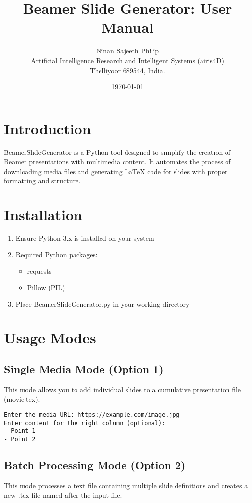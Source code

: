 \documentclass{article}
\title{Beamer Slide Generator: User Manual}
\author{Ninan Sajeeth Philip\\\href{https://airis4d.com}{Artificial Intelligence Research and Intelligent Systems (airis4D)}\\Thelliyoor 689544, India.}
\date{\today}
\begin{document}
\maketitle

\section{Introduction}
BeamerSlideGenerator is a Python tool designed to simplify the creation of Beamer presentations with multimedia content. It automates the process of downloading media files and generating LaTeX code for slides with proper formatting and structure.

\section{Installation}
\begin{enumerate}
    \item Ensure Python 3.x is installed on your system
    \item Required Python packages:
    \begin{itemize}
        \item requests
        \item Pillow (PIL)
    \end{itemize}
    \item Place BeamerSlideGenerator.py in your working directory
\end{enumerate}

\section{Usage Modes}

\subsection{Single Media Mode (Option 1)}
This mode allows you to add individual slides to a cumulative presentation file (movie.tex).
\begin{tcolorbox}[title=Example]
\begin{verbatim}
Enter the media URL: https://example.com/image.jpg
Enter content for the right column (optional):
- Point 1
- Point 2
\end{verbatim}
\end{tcolorbox}

\subsection{Batch Processing Mode (Option 2)}
This mode processes a text file containing multiple slide definitions and creates a new .tex file named after the input file.
\end{document}
